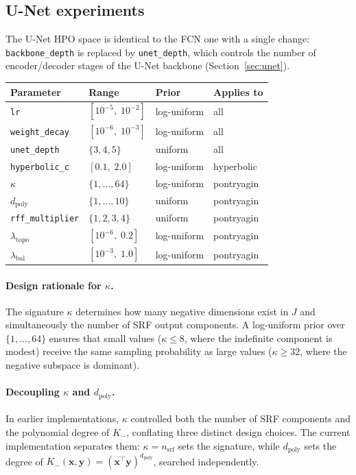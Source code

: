 \documentclass[12pt,a4paper]{article}
\newcommand{\kap}{\kappa}
\newcommand{\dpoly}{d_{\mathrm{poly}}}
\theoremstyle{definition}
\begin{document}
\subsection{U-Net experiments}
\label{sec:hpo_unet}

The U-Net HPO space is identical to the FCN one with a single change:
\texttt{backbone\_depth} is replaced by \texttt{unet\_depth}, which
controls the number of encoder/decoder stages of the U-Net backbone
(Section~\ref{sec:unet}).

\begin{center}
\begin{tabular}{llll}
\toprule
Parameter & Range & Prior & Applies to \\
\midrule
\texttt{lr}              & $[10^{-5},\; 10^{-2}]$ & log-uniform & all \\
\texttt{weight\_decay}   & $[10^{-6},\; 10^{-3}]$ & log-uniform & all \\
\texttt{unet\_depth}     & $\{3, 4, 5\}$           & uniform     & all \\
\texttt{hyperbolic\_c}   & $[0.1,\; 2.0]$          & log-uniform & hyperbolic \\
$\kap$                   & $\{1,\ldots,64\}$       & log-uniform & pontryagin \\
$\dpoly$                 & $\{1,\ldots,10\}$       & uniform     & pontryagin \\
\texttt{rff\_multiplier} & $\{1,2,3,4\}$           & uniform     & pontryagin \\
$\lambda_{\text{topo}}$  & $[10^{-6},\; 0.2]$      & log-uniform & pontryagin \\
$\lambda_{\text{bal}}$   & $[10^{-3},\; 1.0]$      & log-uniform & pontryagin \\
\bottomrule
\end{tabular}
\end{center}

\paragraph{Design rationale for $\kap$.}
The signature $\kap$ determines how many negative dimensions exist in $J$ and
simultaneously the number of SRF output components.  A log-uniform prior over
$\{1,\ldots,64\}$ ensures that small values ($\kap \leq 8$, where the
indefinite component is modest) receive the same sampling probability as large
values ($\kap \geq 32$, where the negative subspace is dominant).

\paragraph{Decoupling $\kap$ and $\dpoly$.}
In earlier implementations, $\kap$ controlled both the number of SRF
components and the polynomial degree of $K_-$, conflating three distinct
design choices.  The current implementation separates them:
$\kap = n_{\text{srf}}$ sets the signature, while $\dpoly$ sets the degree
of $K_-(\mathbf{x},\mathbf{y}) = (\mathbf{x}^\top\mathbf{y})^{\dpoly}$,
searched independently.
\end{document}
